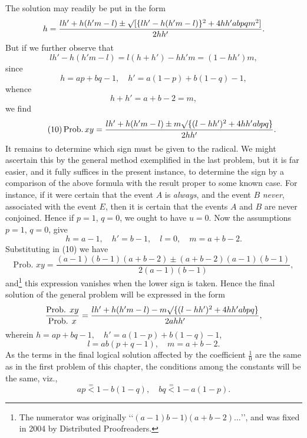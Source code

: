 \documentclass[oneside]{book}
\begin{document}
The solution may readily be put in the form
\begin{equation*}
h=\frac{lh'+h(h'm-l)\pm\surd[\{lh'-h(h'm-l)\}^2+4hh'abpqm^2]}{2hh'}.
\end{equation*}
But if we further observe that
\begin{equation*}
lh' - h (h'm -l) = l(h + h') - hh'm = (1 - hh') m,
\end{equation*}
since
\begin{equation*}
h = ap + bq - 1, \quad h' = a (1 - p) + b (1 - q) - 1,
\end{equation*}
whence
\begin{equation*}
h+h'=a + b-2 = m,
\end{equation*}
we find
\begin{equation*}\tag{10}
\operatorname{Prob. } xy
= \frac{lh'+h(h'm-l)\pm m\surd\{(l-hh')^2+4hh'abpq\}}{2hh'}.
\end{equation*}
It remains to determine which sign must be given to the
radical. We might ascertain this by the general method exemplified
in the last problem, but it is far easier, and it fully suffices in the
present instance, to determine the sign by a comparison of the
above formula with the result proper to some known case. For
instance, if it were certain that the event $A$ is \emph{always}, and the
event $B$ \emph{never}, associated with the event $E$, then it is certain that
the events $A$ and $B$ are never conjoined. Hence if $p = 1$, $q = 0$,
we ought to have $u = 0$. Now the assumptions $p = 1$, $q = 0$,
give
\[
  h = a - 1,\quad h'= b - 1,\quad l = 0,\quad m = a + b - 2.
\]
Substituting in (10) we have
\[
  \text{Prob. }xy
 = \frac{(a-1)(b-1)(a+b-2) \pm (a + b - 2)(a-1)(b-1)}{2(a-1)(b-1)},
\]%
and\footnote{The numerator was originally \lq\lq$(a-1)b-1)(a+b-2)\dots$\rq\rq, and was fixed in 2004 by Distributed Proofreaders.
} this expression vanishes when the lower sign is taken.
Hence the final solution of the general problem will be expressed
in the form
\[
  \frac{\text{Prob. }xy}{\text{Prob. }x}
  = \frac{ lh' + h(h'm-l) - m\surd\{(l-hh')^2 + 4hh'abpq\} }{2ahh'},
\]
wherein $h = ap + bq - 1,\quad h' = a(1-p) + b(1-q) - 1$,
\[
  l = ab(p + q - 1),\quad m = a + b - 2.
\]
As the terms in the final logical solution affected by the coefficient $\frac{1}{0}$ are the same as in the first problem of this chapter,
the conditions among the constants will be the same, viz.,
\[
  ap \stackrel{=}{<} 1 - b(1-q),\quad bq \stackrel{=}{<} 1 - a(1-p).
\]
\end{document}
